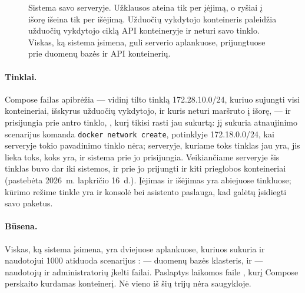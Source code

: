 \begin{figure}[H]
\caption{Sistema savo serveryje. Užklausos ateina tik per įėjimą, o ryšiai į išorę išeina tik per
išėjimą. Užduočių vykdytojo konteineris paleidžia užduočių vykdytojo ciklą API konteineryje ir
neturi savo tinklo. Viskas, ką sistema įsimena, guli serverio aplankuose, prijungtuose prie
duomenų bazės ir API konteinerių.}\label{fig:ops:host}
\end{figure}

\paragraph{Tinklai.} Compose failas apibrėžia  --- vidinį tilto tinklą
172.28.10.0/24, kuriuo sujungti visi konteineriai, išskyrus užduočių vykdytojo, ir kuris neturi
maršruto į išorę, --- ir prisijungia prie antro tinklo, , kurį tikisi rasti jau
sukurtą: jį sukuria atnaujinimo scenarijus komanda \texttt{docker network create}, potinklyje
172.18.0.0/24, kai serveryje tokio pavadinimo tinklo nėra; serveryje, kuriame toks tinklas jau
yra, jis lieka toks, koks yra, ir sistema prie jo prisijungia. Veikiančiame serveryje šis tinklas
buvo dar iki sistemos, ir prie jo prijungti ir kiti prieglobos konteineriai (pastebėta 2026~m.
lapkričio 16~d.). Įėjimas ir išėjimas yra abiejuose tinkluose; kūrimo režime tinkle 
yra ir konsolė bei asistento paslauga, kad galėtų įsidiegti savo paketus.

\paragraph{Būsena.} Viskas, ką sistema įsimena, yra dviejuose aplankuose, kuriuos sukuria ir
naudotojui 1000 atiduoda scenarijus :  --- duomenų bazės
klasteris, ir  --- naudotojų ir administratorių įkelti failai. Paslaptys
laikomos faile , kurį Compose perskaito kurdamas konteinerį. Nė vieno iš šių trijų nėra
saugykloje.

